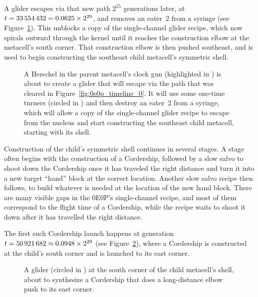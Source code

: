 A glider escapes via that new path $2^{25}$ generations later, at $t = 33{\,}554{\,}432 = 0.0625 \times 2^{29}$, and removes an eater~2 from a syringe (see Figure~\ref{fig:0e0p_timeline_33554432}). This unblocks a copy of the single-channel glider recipe, which now spirals outward through the kernel until it reaches the construction elbow at the metacell's south corner. That construction elbow is then pushed southeast, and is used to begin constructing the southeast child metacell's symmetric shell.

\begin{figure}[!htb]
	\centering
	\caption{A Herschel in the parent metacell's clock gun (highlighted in ) is about to create a glider that will escape via the path that was cleared in Figure~\ref{fig:0e0p_timeline_0}. It will use some one-time turners (circled in ) and then destroy an eater~2 from a syringe, which will allow a copy of the single-channel glider recipe to escape from the nucleus and start constructing the southeast child metacell, starting with its shell.}
	\label{fig:0e0p_timeline_33554432}
\end{figure}

Construction of the child's symmetric shell continues in several stages. A stage often begins with the construction of a Cordership, followed by a slow salvo to shoot down the Cordership once it has traveled the right distance and turn it into a new target ``hand'' block at the correct location. Another slow salvo recipe then follows, to build whatever is needed at the location of the new hand block. There are many visible gaps in the 0E0P's single-channel recipe, and most of them correspond to the flight time of a Cordership, while the recipe waits to shoot it down after it has travelled the right distance.

The first such Cordership launch happens at generation $t = 50{\,}921{\,}682 \approx 0.0948 \times 2^{29}$ (see Figure~\ref{fig:0e0p_timeline_50921682}), where a Cordership is constructed at the child's south corner and is launched to its east corner.

\begin{figure}[!htb]
	\centering
	\caption{A glider (circled in ) at the south corner of the child metacell's shell, about to synthesize a Cordership that does a long-distance elbow push to its east corner.}
	\label{fig:0e0p_timeline_50921682}
\end{figure}

